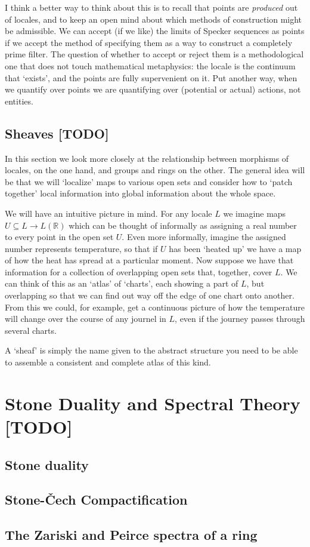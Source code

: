 \documentclass[oneside,english]{amsbook}
\numberwithin{section}{chapter}
\theoremstyle{plain}
\theoremstyle{definition}
\providecommand{\Cech}{\v{C}ech }
\begin{document}
I think a better way to think about this is to recall that points are \emph{produced} out of locales, and to keep an open mind about which methods of construction might be admissible. We can accept (if we like) the limits of Specker sequences as points if we accept the method of specifying them as a way to construct a completely prime filter. The question of whether to accept or reject them is a methodological one that does not touch mathematical metaphysics: the locale is the continuum that `exists', and the points are fully supervenient on it. Put another way, when we quantify over points we are quantifying over (potential or actual) actions, not entities.


\section{Sheaves [TODO]}

In this section we look more closely at the relationship between morphisms of locales, on the one hand, and groups and rings on the other. The general idea will be that we will `localize' maps to various open sets and consider how to `patch together' local information into global information about the whole space.

We will have an intuitive picture in mind. For any locale $L$ we imagine maps $U\subseteq L\to L(\mathbb{R})$ which can be thought of informally as assigning a real number to every point in the open set $U$. Even more informally, imagine the assigned number represents temperature, so that if $U$ has been `heated up' we have a map of how the heat has spread at a particular moment. Now suppose we have that information for a collection of overlapping open sets that, together, cover $L$. We can think of this as an `atlas' of `charts', each showing a part of $L$, but overlapping so that we can find out way off the edge of one chart onto another. From this we could, for example, get a continuous picture of how the temperature will change over the course of any journel in $L$, even if the journey passes through several charts.

A `sheaf' is simply the name given to the abstract structure you need to be able to assemble a consistent and complete atlas of this kind.







\chapter{Stone Duality and Spectral Theory [TODO]}

\section{Stone duality}
\section{Stone-\Cech Compactification}
\section{The Zariski and Peirce spectra of a ring}
\end{document}

